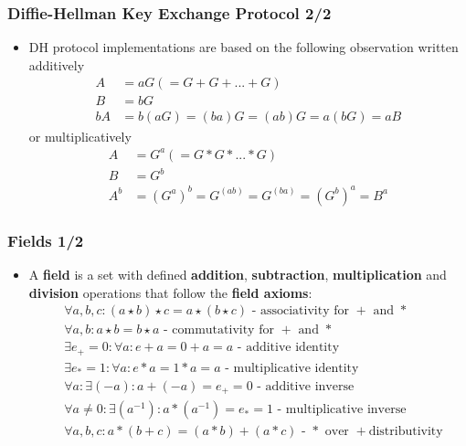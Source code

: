 \documentclass{beamer}
\begin{document}
\begin{frame}
  \frametitle{Diffie-Hellman Key Exchange Protocol 2/2}
  \begin{itemize}
  \item DH protocol implementations are based on the following observation
    written additively
    \begin{align*}
      A &= aG (= G + G + ... + G) \\
      B &= bG \\
      bA &= b(aG) = (ba)G = (ab)G = a(bG) = aB
    \end{align*}
    or multiplicatively
    \begin{align*}
      A &= G^a (= G * G * ... * G) \\
      B &= G^b \\
      A^b &= (G^a)^b = G^{(ab)} = G^{(ba)} = (G^b)^a = B^a
    \end{align*}
  \end{itemize}
\end{frame}

\begin{frame}
  \frametitle{Fields 1/2}
  \begin{itemize}
  \item A \textbf{field} is a set with defined \textbf{addition},
    \textbf{subtraction}, \textbf{multiplication} and \textbf{division}
    operations that follow the \textbf{field axioms}:
    \begin{align*}
      &\forall a, b, c: (a \star b) \star c = a \star (b \star c) \text{ -
        associativity for $+$ and $*$} \\
      &\forall a, b: a \star b = b \star a \text{ - commutativity for $+$ and
        $*$} \\
      &\exists e_+ = 0: \forall a: e + a = 0 + a = a \text{ - additive identity}
      \\
      &\exists e_* = 1: \forall a: e * a = 1 * a = a \text{ - multiplicative
        identity} \\
      &\forall a: \exists (-a): a + (-a) = e_+ = 0 \text{ - additive inverse} \\
      &\forall a \neq 0: \exists (a^{-1}): a * (a^{-1}) = e_* = 1 \text{ -
        multiplicative inverse} \\
      &\forall a, b, c: a*(b+c) = (a*b) + (a*c) \text{ - $*$ over $+$
        distributivity} \\
    \end{align*}
  \end{itemize}
\end{frame}
\end{document}
